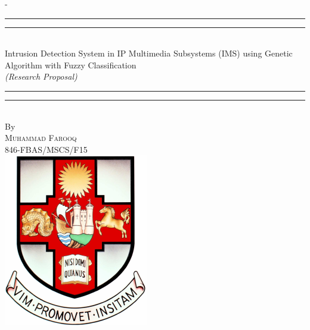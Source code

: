 %
%
% 
%
%
\begin{titlingpage}
\begin{SingleSpace}
\calccentering{\unitlength} 
\begin{adjustwidth*}{\unitlength}{-\unitlength}
\vspace*{3mm}
\begin{center}
\rule[0.5ex]{\linewidth}{2pt}\vspace*{-\baselineskip}\vspace*{3.2pt}
\rule[0.5ex]{\linewidth}{1pt}\\[\baselineskip]
{\HUGE Intrusion Detection System in IP Multimedia Subsystems (IMS) using Genetic Algorithm with Fuzzy Classification }\\[4mm]
{\Large \textit{(Research Proposal)}}\\
\rule[0.5ex]{\linewidth}{1pt}\vspace*{-\baselineskip}\vspace{3.2pt}
\rule[0.5ex]{\linewidth}{2pt}\\
\vspace{6.5mm}
{\large By}\\
\vspace{6.5mm}
{\large\textsc{Muhammad Farooq \\
				846-FBAS/MSCS/F15}}\\
\vspace{11mm}
\includegraphics[scale=0.6]{logos/bristolcrest_colour}\\

\end{center}
\end{adjustwidth*}
\end{SingleSpace}
\end{titlingpage}
